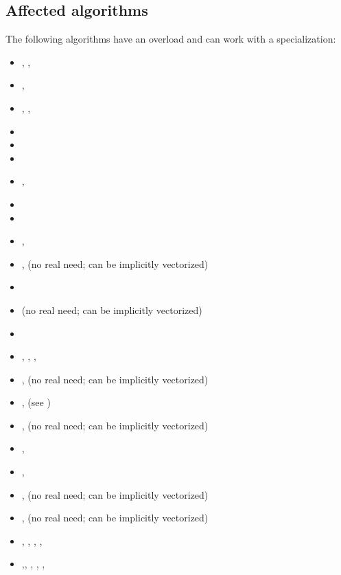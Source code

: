 \subsection{Affected algorithms}
The following algorithms have an  overload and can work with a \simdEPT specialization:
\begin{itemize}
  \item {}, , 
  \item {}, 
  \item {}, , 
  \item {}
  \item {}
  \item {}
  \item {}, 
  \item {}
  \item {}
  \item {}, 
  \item {},  (no real need; can be implicitly vectorized)
  \item {}
  \item {} (no real need; can be implicitly vectorized)
  \item {}
  \item {}, , , 
  \item {},  (no real need; can be implicitly vectorized)
  \item {},  (see )
  \item {},  (no real need; can be implicitly vectorized)
  \item {}, 
  \item {}, 
  \item {},  (no real need; can be implicitly vectorized)
  \item {},  (no real need; can be implicitly vectorized)
  \item {}, , , , 
  \item {},, , , , 

\end{itemize}
